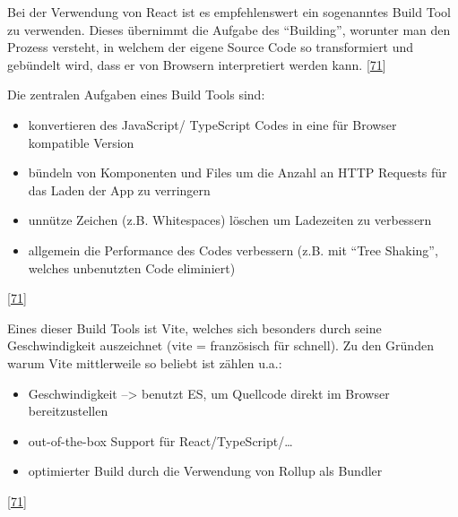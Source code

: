 \documentclass[
    headings=optiontotocandhead,%
    twoside,
    numbers=noenddot,%
    12pt, %
    titlepage, %
    parskip=full, %
    listof=leveldown, 
    numbers=noenddot, %
    a4paper,DIV=14,
    BCOR=15mm,
]{scrbook}
\providecommand{\tightlist}{%
  \setlength{\itemsep}{0pt}\setlength{\parskip}{0pt}}
\begin{document}
Bei der Verwendung von React ist es empfehlenswert ein sogenanntes Build
Tool zu verwenden. Dieses übernimmt die Aufgabe des ``Building'',
worunter man den Prozess versteht, in welchem der eigene Source Code so
transformiert und gebündelt wird, dass er von Browsern interpretiert
werden kann. {[}\protect\hyperlink{ref-CodeParrot-BuildTools}{71}{]}

Die zentralen Aufgaben eines Build Tools sind:

\begin{itemize}
\tightlist
\item
  konvertieren des JavaScript/ TypeScript Codes in eine für Browser
  kompatible Version
\item
  bündeln von Komponenten und Files um die Anzahl an HTTP Requests für
  das Laden der App zu verringern
\item
  unnütze Zeichen (z.B. Whitespaces) löschen um Ladezeiten zu verbessern
\item
  allgemein die Performance des Codes verbessern (z.B. mit ``Tree
  Shaking'', welches unbenutzten Code eliminiert)
\end{itemize}

{[}\protect\hyperlink{ref-CodeParrot-BuildTools}{71}{]}

Eines dieser Build Tools ist Vite, welches sich besonders durch seine
Geschwindigkeit auszeichnet (vite = französisch für schnell). Zu den
Gründen warum Vite mittlerweile so beliebt ist zählen u.a.:

\begin{itemize}
\tightlist
\item
  Geschwindigkeit --\textgreater{} benutzt ES, um Quellcode direkt im
  Browser bereitzustellen
\item
  out-of-the-box Support für React/TypeScript/\ldots{}
\item
  optimierter Build durch die Verwendung von Rollup als Bundler
\end{itemize}

{[}\protect\hyperlink{ref-CodeParrot-BuildTools}{71}{]}
\end{document}
